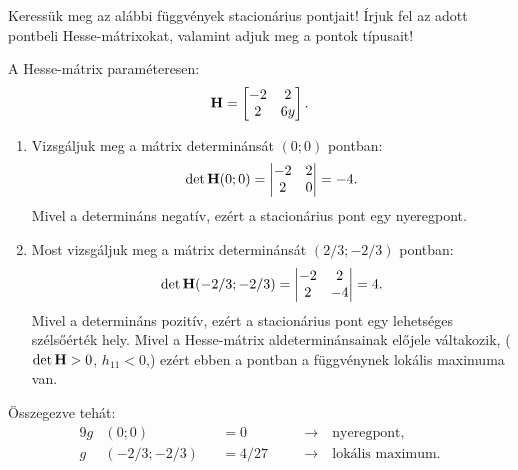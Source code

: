 \documentclass[exercise]{math-standalone}
\begin{document}
\begin{exercise}{%
    Keressük meg az alábbi függvények stacionárius pontjait! Írjuk fel az adott
    pontbeli Hesse-mátrixokat, valamint adjuk meg a pontok típusait!
  }
{\begin{enumerate}[a)]
            A Hesse-mátrix paraméteresen:
            \[
              \mathbf{H} = \begin{bmatrix}
                -2 & 2 \\ 2 & 6y
              \end{bmatrix}
              \text.
            \]

            \begin{enumerate}[1)]
              \item Vizsgáljuk meg a mátrix determinánsát $(0; 0)$ pontban:
                    \[
                      \det \mathbf{H}(0;0) = \begin{vmatrix}
                        -2 & 2 \\ 2 & 0
                      \end{vmatrix} = -4 \text.
                    \]
                    Mivel a determináns negatív, ezért a stacionárius pont
                    egy nyeregpont.

              \item Most vizsgáljuk meg a mátrix determinánsát $(2/3; -2/3)$
                    pontban:
                    \[
                      \det \mathbf{H}(-2/3;-2/3) = \begin{vmatrix}
                        -2 & 2 \\ 2 & -4
                      \end{vmatrix} = 4 \text.
                    \]
                    Mivel a determináns pozitív, ezért a stacionárius pont
                    egy lehetséges szélsőérték hely. Mivel a Hesse-mátrix
                    aldeterminánsainak előjele váltakozik, ($\det \mathbf{H} > 0$,
                    $h_{11} < 0$,) ezért ebben a pontban a függvénynek
                    lokális maximuma van.
            \end{enumerate}

            Összegezve tehát:
            \begin{alignat*}{9}
              g & (0  ; 0  )   &  & = 0 \quad    &  & \rightarrow \quad
              \text{nyeregpont,}
              \\
              g & (-2/3; -2/3) &  & = 4/27 \quad &  & \rightarrow \quad
              \text{lokális maximum.}
            \end{alignat*}

    \end{enumerate}
  }
\end{exercise}
\end{document}

